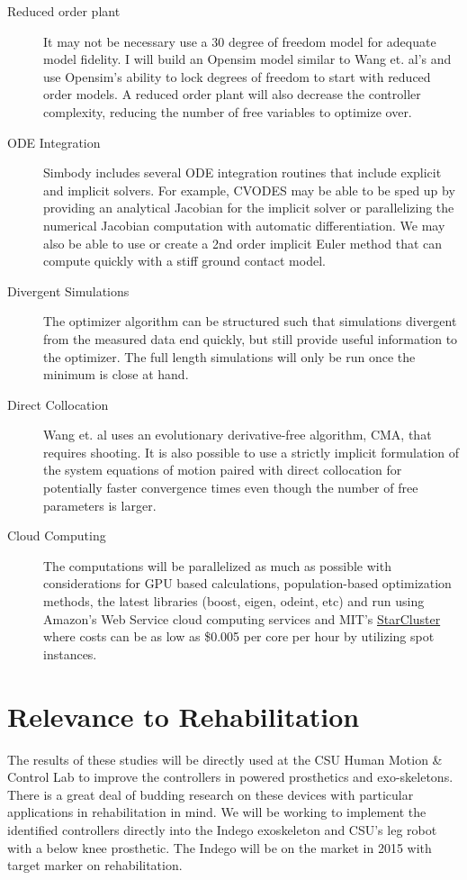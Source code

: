 \documentclass[11pt]{article}
\begin{document}
\begin{description}
  \item[Reduced order plant] It may not be necessary use a 30 degree of freedom
    model for adequate model fidelity. I will build an Opensim model similar to
    Wang et. al's and use Opensim's ability to lock degrees of freedom to start
    with reduced order models. A reduced order plant will also decrease the
    controller complexity, reducing the number of free variables to optimize
    over.
  \item[ODE Integration] Simbody includes several ODE integration routines that
    include explicit and implicit solvers. For example, CVODES may be able to
    be sped up by providing an analytical Jacobian for the implicit solver or
    parallelizing the numerical Jacobian computation with automatic
    differentiation. We may also be able to use or create a 2nd order implicit
    Euler method that can compute quickly with a stiff ground contact model.
  \item[Divergent Simulations] The optimizer algorithm can be structured such
    that simulations divergent from the measured data end quickly, but still
    provide useful information to the optimizer. The full length simulations
    will only be run once the minimum is close at hand.
  \item[Direct Collocation] Wang et. al uses an evolutionary derivative-free
    algorithm, CMA, that requires shooting. It is also possible to use a
    strictly implicit formulation of the system equations of motion paired with
    direct collocation \cite{Ackermann2010} for potentially faster convergence
    times even though the number of free parameters is larger.
  \item[Cloud Computing] The computations will be parallelized as much as
    possible with considerations for GPU based calculations, population-based
    optimization methods, the latest libraries (boost, eigen, odeint, etc) and
    run using Amazon's Web Service cloud computing services and MIT's
    \href{http://star.mit.edu/cluster/}{StarCluster} where costs can be as low
    as \$0.005 per core per hour by utilizing spot instances.
\end{description}

\section*{Relevance to Rehabilitation}

The results of these studies will be directly used at the CSU Human Motion \&
Control Lab to improve the controllers in powered prosthetics and
exo-skeletons.  There is a great deal of budding research on these devices with
particular applications in rehabilitation in mind. We will be working to
implement the identified controllers directly into the Indego exoskeleton and
CSU's leg robot with a below knee prosthetic. The Indego will be on the market
in 2015 with target marker on rehabilitation.
\end{document}
